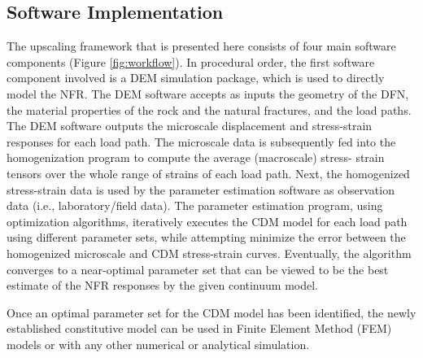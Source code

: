 \subsection{Software Implementation}
The upscaling framework that is presented here consists of four main software components (Figure \ref{fig:workflow}). In procedural order, the first software component involved is a DEM simulation package, which is used to directly model the NFR. The DEM software accepts as inputs the geometry of the DFN, the material properties of the rock and the natural fractures, and the load paths. The DEM software outputs the microscale displacement and stress-strain responses for each load path.  The microscale data is subsequently fed into the homogenization program to compute the average (macroscale) stress- strain tensors over the whole range of strains of each load path. Next, the homogenized stress-strain data is used by the parameter estimation software as observation data (i.e., laboratory/field data). The parameter estimation program, using optimization algorithms, iteratively executes the CDM model for each load path using different parameter sets, while attempting minimize the error between the homogenized microscale and CDM stress-strain curves. Eventually, the algorithm converges to a near-optimal parameter set that can be viewed to be the best estimate of the NFR responses by the given continuum model.

Once an optimal parameter set for the CDM model has been identified, the newly established constitutive model can be used in Finite Element Method (FEM) models or with any other numerical or analytical simulation.


